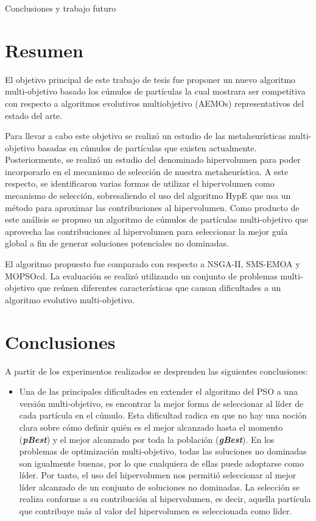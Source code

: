 \begin{chapter}{Conclusiones y trabajo futuro}

  \section{Resumen}

  El objetivo principal de este trabajo de tesis fue proponer un nuevo algoritmo multi-objetivo basado los c\'umulos de 
  part\'iculas la cual mostrara ser competitiva con respecto a algoritmos evolutivos multiobjetivo (AEMOs) representativos del estado 
  del arte.

  Para llevar a cabo este objetivo se realiz\'o un estudio de las metaheur\'isticas multi-objetivo basadas en 
  c\'umulos de part\'iculas que existen actualmente. Posteriormente, se realiz\'o un estudio del denominado hipervolumen 
  para poder incorporarlo en el mecanismo de selecci\'on de nuestra metaheur\'istica. A este respecto, se identificaron
  varias formas de utilizar el hipervolumen como mecanismo de selecci\'on, sobresaliendo
  el uso del algoritmo HypE que usa un m\'etodo para aproximar las contribuciones al hipervolumen. 
  Como producto de este an\'alisis se propuso un algoritmo de c\'umulos de part\'iculas multi-objetivo que aprovecha las contribuciones al 
  hipervolumen para seleccionar la mejor gu\'ia global a fin de generar soluciones potenciales no dominadas.

  El algoritmo propuesto fue comparado con respecto a NSGA-II, SMS-EMOA y MOPSOcd. La evaluaci\'on se realiz\'o utilizando un conjunto 
  de problemas multi-objetivo que re\'unen diferentes 
  caracter\'isticas que causan dificultades a un algoritmo evolutivo multi-objetivo.

  \section{Conclusiones}

  A partir de los experimentos realizados se desprenden las siguientes conclusiones:

  \begin{itemize}
  \item Una de las principales dificultades en extender el algoritmo del PSO a una versi\'on multi-objetivo, es encontrar la mejor 
  forma de seleccionar al l\'ider de cada part\'icula en el c\'umulo. Esta dificultad radica en que no hay una noci\'on clara sobre 
  c\'omo definir qui\'en es el mejor alcanzado hasta el momento (\textbf{\textit{pBest}}) y el mejor 
  alcanzado por toda la poblaci\'on (\textbf{\textit{gBest}}). En los problemas de optimizaci\'on multi-objetivo, 
  todas las soluciones no dominadas son igualmente buenas, por lo que cualquiera de ellas puede adoptarse como l\'ider. Por tanto, el 
  uso del hipervolumen nos permiti\'o seleccionar al mejor l\'ider alcanzado de un conjunto de soluciones no dominadas. La selecci\'on
  se realiza conforme a su contribuci\'on al hipervolumen, es decir, aquella part\'icula que contribuye m\'as al valor del hipervolumen
  es seleccionada como l\'ider.


\end{itemize}
\end{chapter}

